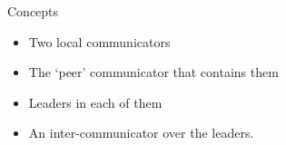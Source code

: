 \begin{frame}{Concepts}
\label{sl:intercomm-concepts}
\begin{itemize}
\item Two local communicators
\item The `peer' communicator that contains them
\item Leaders in each of them
\item An inter-communicator over the leaders.
\end{itemize}
\end{frame}
